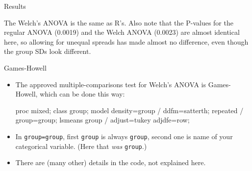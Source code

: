 \documentclass[unknownkeysallowed]{beamer}\usepackage[]{graphicx}\usepackage[]{color}
\begin{document}
\begin{frame}[fragile]{Results}
  

The Welch's ANOVA is the same as R's. Also note that the P-values for
the regular ANOVA (0.0019) and the Welch ANOVA (0.0023) are almost
identical here, so allowing for unequal spreads has made almost no
difference, even though the group SDs look different.
  
\end{frame}
\begin{frame}[fragile]{Games-Howell}
  
  \begin{itemize}
  \item The approved multiple-comparisons test for Welch's ANOVA is
    Games-Howell, which can be done this way:
    
    \begin{Sascode}[store=rugap]
proc mixed;
  class group;
  model density=group / ddfm=satterth;
  repeated / group=group;
  lsmeans group / adjust=tukey adjdfe=row;
    \end{Sascode}
    
    
  \item In \texttt{group=group}, first \texttt{group} is always
    \texttt{group}, second one is name of your categorical
    variable. (Here that \emph{was} \texttt{group}.)
  \item There are (many other) details in the code, not explained here.
        
  \end{itemize}
  
\end{frame}
\end{document}
